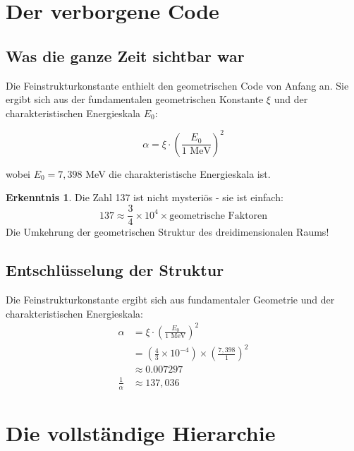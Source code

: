 \documentclass[12pt,a4paper]{article}
\theoremstyle{definition}
\newtheorem{erkenntnis}{Erkenntnis}[section]
\begin{document}
	\section{Der verborgene Code}
	
	\subsection{Was die ganze Zeit sichtbar war}
	
	Die Feinstrukturkonstante enthielt den geometrischen Code von Anfang an. Sie ergibt sich aus der fundamentalen geometrischen Konstante $\xi$ und der charakteristischen Energieskala $E_0$:
	
	\begin{equation}
		\alpha = \xi \cdot \left(\frac{E_0}{1 \text{ MeV}}\right)^2
	\end{equation}
	
	wobei $E_0 = 7,398$ MeV die charakteristische Energieskala ist.
	
	\begin{erkenntnis}
		Die Zahl 137 ist nicht mysteriös - sie ist einfach:
		\begin{equation}
			137 \approx \frac{3}{4} \times 10^4 \times \text{geometrische Faktoren}
		\end{equation}
		Die Umkehrung der geometrischen Struktur des dreidimensionalen Raums!
	\end{erkenntnis}
	
	\subsection{Entschlüsselung der Struktur}
	
	\begin{fundamental}
		Die Feinstrukturkonstante ergibt sich aus fundamentaler Geometrie und der charakteristischen Energieskala:
		\begin{align}
			\alpha &= \xi \cdot \left(\frac{E_0}{1 \text{ MeV}}\right)^2 \\
			&= \left(\frac{4}{3} \times 10^{-4}\right) \times \left(\frac{7,398}{1}\right)^2 \\
			&\approx 0.007297 \\
			\frac{1}{\alpha} &\approx 137,036
		\end{align}
	\end{fundamental}
	
	\section{Die vollständige Hierarchie}
	
\end{document}
